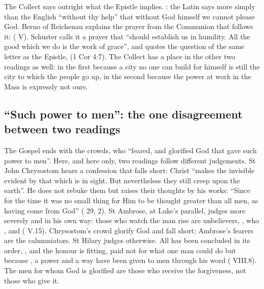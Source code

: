 The Collect says outright what the Epistle implies. : the Latin says more simply than the English ``without thy
help'' that without God himself we cannot please God. Berno of Reichenau
explains the prayer from the Communion that follows it: 
( V). Schuster calls it a prayer that ``should establish us in
humility. All the good which we do is the work of grace'', and quotes the
question of the same letter as the Epistle,  (1 Cor 4:7). The Collect has a place in the other two readings as
well: in the first because a city no one can build for himself is still the city
to which the people go up, in the second because the power at work in the Mass is
expressly not ours.

\subsection{``Such power to men'': the one disagreement between two readings}

The Gospel ends with the crowds, who ``feared, and glorified God that gave such
power to men''. Here, and here only, two readings follow different judgements.
St John Chrysostom hears a confession that falls short: Christ ``makes the
invisible evident by that which is in sight. But nevertheless they still creep
upon the earth''. He does not rebuke them but raises their thoughts by his
works: ``Since for the time it was no small thing for Him to be thought greater
than all men, as having come from God'' ( 29, 2). St Ambrose, at Luke's parallel, judges more
severely and in his own way: those who watch the man rise are unbelievers,
, who , and 
( V.15). Chrysostom's crowd glorify God and fall
short; Ambrose's fearers are the calumniators. St Hilary judges otherwise. All
has been concluded in its order, , and
the honour is fitting, paid not for what one man could do but because
, a power
and a way have been given to men through his word ( VIII.8). The men for whom God is glorified are those who receive the
forgiveness, not those who give it.

